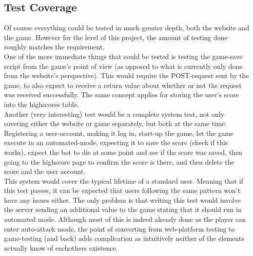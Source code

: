 \documentclass[12pt]{report}
\begin{document}
\subsection*{Test Coverage}
Of course everything could be tested in much greater depth, both the website and the game. However for the level of this project, the amount of testing done roughly matches the requirement.\\
One of the more immediate things that could be tested is testing the game-save script from the game's point of view (as opposed to what is currently only done from the website's perspective). This would require the POST-request sent by the game, to also expect to receive a return value about whether or not the request was received successfully. The same concept applies for storing the user's score into the highscores table.\\
Another (very interesting) test would be a complete system test, not only covering either the website or game separately, but both at the same time. Registering a user-account, making it log in, start-up the game, let the game execute in an automated-mode, expecting it to save the score (check if this works), expect the bot to die at some point and see if the score was saved, then going to the highscore page to confirm the score is there, and then delete the score and the user account.\\
This system would cover the typical lifetime of a standard user. Meaning that if this test passes, it can be expected that users following the same pattern won't have any issues either. The only problem is that writing this test would involve the server sending an additional value to the game stating that it should run in automated mode. Although most of this is indeed already done as the player can enter auto-attack mode, the point of converting from web-platform testing to game-testing (and back) adds complication as intuitively neither of the elements actually know of eachothers existence.
\end{document}
